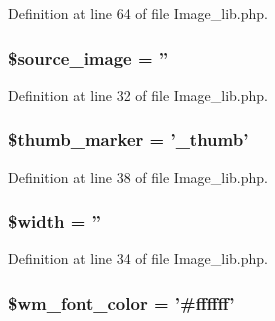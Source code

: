 Definition at line 64 of file Image\-\_\-lib.\-php.

\hypertarget{class_c_i___image__lib_a54fc395722d5e9f15d656d22ba84e382}{
\subsubsection[{\$source\-\_\-image}]{\setlength{\rightskip}{0pt plus 5cm}\$source\-\_\-image = ''}}\label{class_c_i___image__lib_a54fc395722d5e9f15d656d22ba84e382}


Definition at line 32 of file Image\-\_\-lib.\-php.

\hypertarget{class_c_i___image__lib_a3176700c651c0c3cd8cfa186ba03302a}{
\subsubsection[{\$thumb\-\_\-marker}]{\setlength{\rightskip}{0pt plus 5cm}\$thumb\-\_\-marker = '\-\_\-thumb'}}\label{class_c_i___image__lib_a3176700c651c0c3cd8cfa186ba03302a}


Definition at line 38 of file Image\-\_\-lib.\-php.

\hypertarget{class_c_i___image__lib_a5795120b4b324bc4ca83f1e6fdce7d57}{
\subsubsection[{\$width}]{\setlength{\rightskip}{0pt plus 5cm}\$width = ''}}\label{class_c_i___image__lib_a5795120b4b324bc4ca83f1e6fdce7d57}


Definition at line 34 of file Image\-\_\-lib.\-php.

\hypertarget{class_c_i___image__lib_ae9498442637ff2466d4426af45f68c6b}{
\subsubsection[{\$wm\-\_\-font\-\_\-color}]{\setlength{\rightskip}{0pt plus 5cm}\$wm\-\_\-font\-\_\-color = '\#ffffff'}}\label{class_c_i___image__lib_ae9498442637ff2466d4426af45f68c6b}



